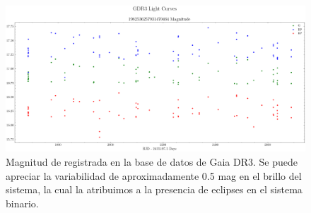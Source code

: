 \begin{figure}[!ht]
	\centering
	\includegraphics[scale=0.42]{Muestra/Secciones/Figures/GDR3-Light-Curves.png}

	\caption{Magnitud de \atoObjId registrada en la base de datos de Gaia DR3.
	Se puede apreciar la variabilidad de aproximadamente 0.5 mag en el brillo
	del sistema, la cual la atribuimos a la presencia de eclipses en el sistema
	binario. \citet{gdr3ReleaseDocumentation}}
	\label{gdr3AtoObjLightCurves}
\end{figure}